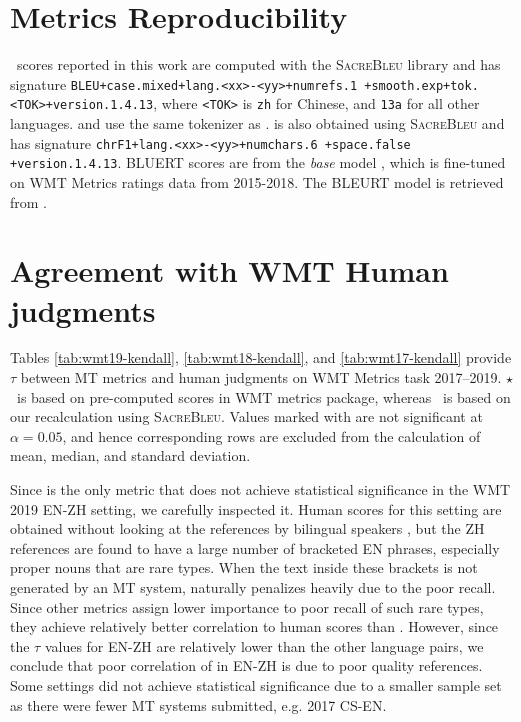 \section{Metrics Reproducibility}
\label{sec:appmetrics}

\bleu\ scores reported in this work are computed with the \textsc{SacreBleu} library and has signature \texttt{\small BLEU+case.mixed+lang.<xx>-<yy>+numrefs.1 +smooth.exp+tok.<TOK>+version.1.4.13}, where \texttt{<TOK>} is \texttt{zh} for Chinese, and \texttt{13a} for all other languages.  and  use the same tokenizer as \bleu.
 is also obtained using \textsc{SacreBleu} and has signature \texttt{\small chrF1+lang.<xx>-<yy>+numchars.6 +space.false +version.1.4.13}.
BLUERT scores are from the \textit{base} model \citet{sellam-etal-2020-bleurt}, which is fine-tuned on WMT Metrics ratings data from 2015-2018.
The BLEURT model is retrieved from .


\section{Agreement with WMT Human judgments}
\label{sec:apphuman}

Tables \ref{tab:wmt19-kendall}, \ref{tab:wmt18-kendall}, and \ref{tab:wmt17-kendall} provide $\tau$ between MT metrics and human judgments on WMT Metrics task 2017--2019. 
$\star$\bleu\ is based on pre-computed scores in WMT metrics package, whereas \bleu\ is based on our recalculation using \textsc{SacreBleu}. 
Values marked with \insig are not significant at $\alpha=0.05$, and hence corresponding rows are excluded from the calculation of mean, median, and standard deviation.

Since  is the only metric that does not achieve statistical significance in the WMT 2019 EN-ZH setting, we carefully inspected it.
Human scores for this setting are obtained without looking at the references by bilingual speakers \cite{WMT19-metrics-proceedings}, but the ZH references are found to have a large number of bracketed EN phrases, especially proper nouns that are rare types.
When the text inside these brackets is not generated by an MT system,  naturally penalizes heavily due to the poor recall.
Since other metrics assign lower importance to poor recall of such rare types, they achieve relatively better correlation to human scores than . 
However, since the $\tau$ values for EN-ZH are relatively lower than the other language pairs, we conclude that poor correlation of  in EN-ZH is due to poor quality references.
Some settings did not achieve statistical significance due to a smaller sample set as there were fewer MT systems submitted, e.g. 2017 CS-EN.


